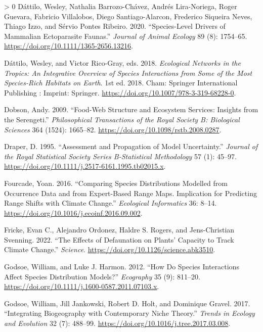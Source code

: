 \documentclass[10pt,oneside]{article}
\newlength{\cslhangindent}
\newenvironment{CSLReferences}[3] %
 {%
  \setlength{\parindent}{0pt}
  \ifodd #1 \everypar{\setlength{\hangindent}{\cslhangindent}}\ignorespaces\fi
  \ifnum #2 > 0
  \setlength{\parskip}{#2\baselineskip}
  \fi
 }%
 {}
\begin{document}
\begin{CSLReferences}{1}{0}
\leavevmode\hypertarget{ref-Dattilo2020SpeDri}{}%
Dáttilo, Wesley, Nathalia Barrozo-Chávez, Andrés Lira-Noriega, Roger
Guevara, Fabricio Villalobos, Diego Santiago-Alarcon, Frederico Siqueira
Neves, Thiago Izzo, and Sérvio Pontes Ribeiro. 2020. {``Species-Level
Drivers of Mammalian Ectoparasite Faunas.''} \emph{Journal of Animal
Ecology} 89 (8): 1754--65.
\url{https://doi.org/10.1111/1365-2656.13216}.

\leavevmode\hypertarget{ref-Dattilo2018EcoNet}{}%
Dáttilo, Wesley, and Victor Rico-Gray, eds. 2018. \emph{Ecological
Networks in the Tropics: An Integrative Overview of Species Interactions
from Some of the Most Species-Rich Habitats on Earth}. 1st ed. 2018.
Cham: Springer International Publishing : Imprint: Springer.
\url{https://doi.org/10.1007/978-3-319-68228-0}.

\leavevmode\hypertarget{ref-Dobson2009FooStr}{}%
Dobson, Andy. 2009. {``Food-Web Structure and Ecosystem Services:
Insights from the Serengeti.''} \emph{Philosophical Transactions of the
Royal Society B: Biological Sciences} 364 (1524): 1665--82.
\url{https://doi.org/10.1098/rstb.2008.0287}.

\leavevmode\hypertarget{ref-Draper1995AssPro}{}%
Draper, D. 1995. {``Assessment and Propagation of Model Uncertainty.''}
\emph{Journal of the Royal Statistical Society Series B-Statistical
Methodology} 57 (1): 45--97.
\url{https://doi.org/10.1111/j.2517-6161.1995.tb02015.x}.

\leavevmode\hypertarget{ref-Fourcade2016ComSpe}{}%
Fourcade, Yoan. 2016. {``Comparing Species Distributions Modelled from
Occurrence Data and from Expert-Based Range Maps. Implication for
Predicting Range Shifts with Climate Change.''} \emph{Ecological
Informatics} 36: 8--14.
\url{https://doi.org/10.1016/j.ecoinf.2016.09.002}.

\leavevmode\hypertarget{ref-Fricke2022EffDef}{}%
Fricke, Evan C., Alejandro Ordonez, Haldre S. Rogers, and Jens-Christian
Svenning. 2022. {``The Effects of Defaunation on Plants' Capacity to
Track Climate Change.''} \emph{Science}.
\url{https://doi.org/10.1126/science.abk3510}.

\leavevmode\hypertarget{ref-Godsoe2012HowSpe}{}%
Godsoe, William, and Luke J. Harmon. 2012. {``How Do Species
Interactions Affect Species Distribution Models?''} \emph{Ecography} 35
(9): 811--20. \url{https://doi.org/10.1111/j.1600-0587.2011.07103.x}.

\leavevmode\hypertarget{ref-Godsoe2017IntBio}{}%
Godsoe, William, Jill Jankowski, Robert D. Holt, and Dominique Gravel.
2017. {``Integrating Biogeography with Contemporary Niche Theory.''}
\emph{Trends in Ecology and Evolution} 32 (7): 488--99.
\url{https://doi.org/10.1016/j.tree.2017.03.008}.


\end{CSLReferences}
\end{document}
